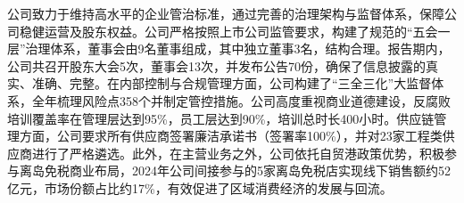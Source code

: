 \documentclass[a4paper,12pt]{article}
\begin{document}
公司致力于维持高水平的企业管治标准，通过完善的治理架构与监督体系，保障公司稳健运营及股东权益。公司严格按照上市公司监管要求，构建了规范的“五会一层”治理体系，董事会由9名董事组成，其中独立董事3名，结构合理。报告期内，公司共召开股东大会5次，董事会13次，并发布公告70份，确保了信息披露的真实、准确、完整。在内部控制与合规管理方面，公司构建了“三全三化”大监督体系，全年梳理风险点358个并制定管控措施。公司高度重视商业道德建设，反腐败培训覆盖率在管理层达到95\%，员工层达到90\%，培训总时长400小时。供应链管理方面，公司要求所有供应商签署廉洁承诺书（签署率100\%），并对23家工程类供应商进行了严格遴选。此外，在主营业务之外，公司依托自贸港政策优势，积极参与离岛免税商业布局，2024年公司间接参与的5家离岛免税店实现线下销售额约52亿元，市场份额占比约17\%，有效促进了区域消费经济的发展与回流。
\end{document}
